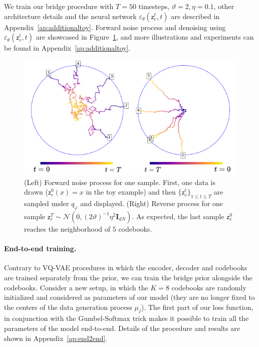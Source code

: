 \documentclass[nolayout]{article}
\theoremstyle{plain}
\theoremstyle{definition}
\theoremstyle{remark}
\newcommand{\latentcont}{\mathsf{z}_e}
\begin{document}
We train our bridge procedure with $T=50$ timesteps, $\vartheta=2, \eta=0.1$, other architecture details and the neural network $\varepsilon_\theta(\latentcont^t ,t)$ are described in Appendix~\ref{ap:additionaltoy}. Forward noise process and denoising using $\varepsilon_\theta(\latentcont^t ,t)$ are showcased in Figure~\ref{fig:noisedenoise}, and more illustrations and experiments can be found in Appendix~\ref{ap:additionaltoy}. 

\begin{figure}[h!]
    \centering
    \includegraphics[scale=0.4]{images/noisedenoise2.png}
    \caption{(Left) Forward noise process for one sample. First, one data is drawn ($\latentcont^0(x) =x$ in the toy example)  and then $\{\latentcont^t\}_{1\leq t \leq T}$ are sampled under $q_\varphi$ and displayed. 
    (Right) Reverse process for one sample $\latentcont^T\sim  \mathcal{N}(0, (2\vartheta)^{-1}\eta^2 \mathbf{I}_{dN})$. As expected, the last sample $\latentcont^0$ reaches the neighborhood of $5$ codebooks.}
    \label{fig:noisedenoise}
\end{figure}

 
\paragraph{End-to-end training. } Contrary to VQ-VAE procedures in which the encoder, decoder and codebooks are trained separately from the prior, we can train the bridge prior alongside the codebooks. Consider a new setup, in which the $K=8$ codebooks are randomly initialized and considered as parameters of our model (they are no longer fixed to the centers of the data generation process $\mu_j$). The first part of our loss function, in conjunction with the Gumbel-Softmax trick makes it possible to train all the parameters of the model end-to-end. Details of the procedure and results are shown in Appendix~\ref{ap:end2end}.
\end{document}
